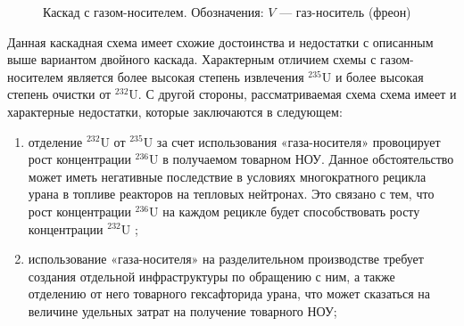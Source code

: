 \begin{figure}[ht]
  \caption{Каскад с газом-носителем. Обозначения: $V$ --- газ-носитель (фреон)}\label{p2_gas}
\end{figure}

Данная каскадная схема имеет схожие достоинства и недостатки с описанным выше вариантом двойного каскада. Характерным отличием схемы с газом-носителем является более высокая степень извлечения  $^{235}$U и более высокая степень очистки от $^{232}$U. С другой стороны, рассматриваемая схема схема имеет и характерные недостатки, которые заключаются в следующем:
\begin{enumerate}
  \item	отделение $^{232}$U от $^{235}$U за счет использования «газа-носителя» провоцирует рост концентрации $^{236}$U в получаемом товарном НОУ. Данное обстоятельство может иметь негативные последствие в условиях многократного рецикла урана в топливе реакторов на тепловых нейтронах. Это связано с тем, что рост концентрации $^{236}$U на каждом рецикле будет способствовать росту концентрации $^{232}$U \cite{smirnovEvolutionIsotopicComposition2012};
  \item	использование «газа-носителя» на разделительном производстве требует создания отдельной инфраструктуры по обращению с ним, а также отделению от него товарного гексафторида урана, что может сказаться на величине удельных затрат на получение товарного НОУ;
\end{enumerate}

